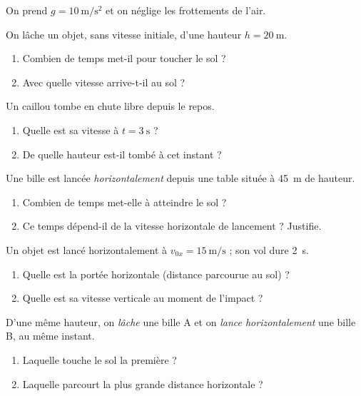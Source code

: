 \documentclass[11pt,a4paper]{article}
\begin{document}
On prend $g=\qty{10}{\metre\per\second\squared}$ et on néglige les frottements de l'air.

\begin{exo}
On lâche un objet, sans vitesse initiale, d'une hauteur $h=\qty{20}{\metre}$.
\begin{enumerate}[label=\alph*)]
  \item Combien de temps met-il pour toucher le sol ?
  \item Avec quelle vitesse arrive-t-il au sol ?
\end{enumerate}
\end{exo}

\begin{exo}
Un caillou tombe en chute libre depuis le repos.
\begin{enumerate}[label=\alph*)]
  \item Quelle est sa vitesse à $t=\qty{3}{\second}$ ?
  \item De quelle hauteur est-il tombé à cet instant ?
\end{enumerate}
\end{exo}

\begin{exo}
Une bille est lancée \emph{horizontalement} depuis une table située à \qty{45}{\metre} de hauteur.
\begin{enumerate}[label=\alph*)]
  \item Combien de temps met-elle à atteindre le sol ?
  \item Ce temps dépend-il de la vitesse horizontale de lancement ? Justifie.
\end{enumerate}
\end{exo}

\begin{exo}
Un objet est lancé horizontalement à $v_{0x}=\qty{15}{\metre\per\second}$ ; son vol dure \qty{2}{\second}.
\begin{enumerate}[label=\alph*)]
  \item Quelle est la portée horizontale (distance parcourue au sol) ?
  \item Quelle est sa vitesse verticale au moment de l'impact ?
\end{enumerate}
\end{exo}

\begin{exo}
D'une même hauteur, on \emph{lâche} une bille A et on \emph{lance horizontalement} une bille B, au même instant.
\begin{enumerate}[label=\alph*)]
  \item Laquelle touche le sol la première ?
  \item Laquelle parcourt la plus grande distance horizontale ?
\end{enumerate}
\end{exo}
\end{document}
